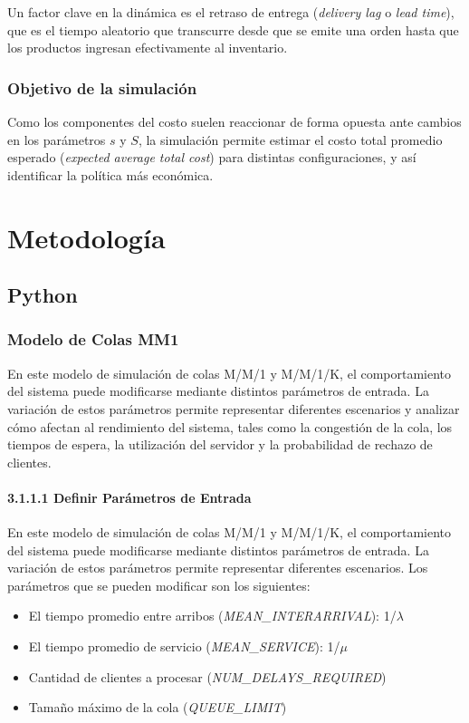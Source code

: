 \documentclass{article}
\begin{document}
Un factor clave en la dinámica es el retraso de entrega (\textit{delivery lag} o \textit{lead time}), que es el tiempo aleatorio que transcurre desde que se emite una orden hasta que los productos ingresan efectivamente al inventario.

\subsubsection{Objetivo de la simulación}
Como los componentes del costo suelen reaccionar de forma opuesta ante cambios en los parámetros $s$ y $S$, la simulación permite estimar el costo total promedio esperado (\textit{expected average total cost}) para distintas configuraciones, y así identificar la política más económica.




\section{Metodología}
\label{sec:metodologia}

\subsection{Python}

\subsubsection{Modelo de Colas MM1}
En este modelo de simulación de colas M/M/1 y M/M/1/K, el comportamiento del sistema puede modificarse mediante distintos parámetros de entrada. La variación de estos parámetros permite representar diferentes escenarios y analizar cómo afectan al rendimiento del sistema, tales como la congestión de la cola, los tiempos de espera, la utilización del servidor y la probabilidad de rechazo de clientes.

\paragraph{3.1.1.1 Definir Parámetros de Entrada}
En este modelo de simulación de colas M/M/1 y M/M/1/K, el comportamiento del sistema puede modificarse mediante distintos parámetros de entrada. La variación de estos parámetros permite representar diferentes escenarios. Los parámetros que se pueden modificar son los siguientes:
\begin{itemize}
    \item El tiempo promedio entre arribos (\textit{MEAN\_INTERARRIVAL}): 1/$\lambda$
    \item El tiempo promedio de servicio (\textit{MEAN\_SERVICE}): 1/$\mu$
    \item Cantidad de clientes a procesar (\textit{NUM\_DELAYS\_REQUIRED})
    \item Tamaño máximo de la cola (\textit{QUEUE\_LIMIT})
\end{itemize}
\end{document}
